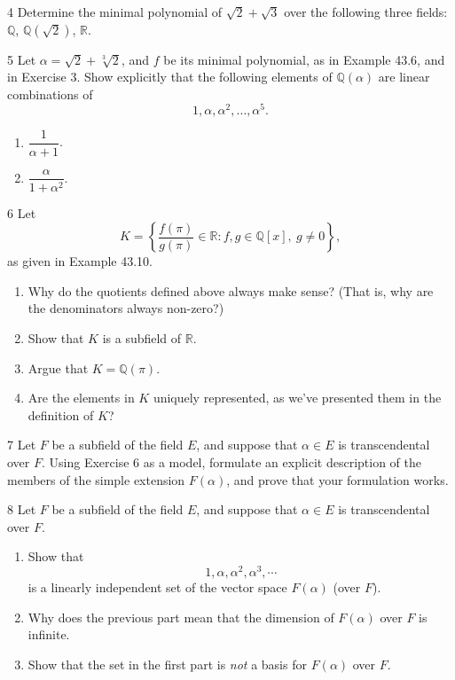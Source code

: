 \begin{problem}{4}
    Determine the minimal polynomial of $\sqrt{2} + \sqrt{3}$ over the following three
    fields: $\mathbb{Q}$, $\mathbb{Q}(\sqrt{2})$, $\mathbb{R}$.
\end{problem}
\unsolved

\begin{problem}{5}
    Let $\alpha = \sqrt{2} + \sqrt[3]{2}$, and $f$ be its minimal polynomial, as in
    Example 43.6, and in Exercise 3. Show explicitly that the following elements of
    $\mathbb{Q}(\alpha)$ are linear combinations of
    \[1, \alpha, \alpha^2, \ldots, \alpha^5.\]
    \begin{enumerate}
        \item[(a)] $\dfrac{1}{\alpha + 1}$.
        \item[(b)] $\dfrac{\alpha}{1 + \alpha^2}$.
    \end{enumerate}
\end{problem}
\unsolved

\begin{problem}{6}
    Let
    \[K = \left\{\frac{f(\pi)}{g(\pi)} \in \mathbb{R} : f, g \in \mathbb{Q}[x],\ g \neq 0\right\},\]
    as given in Example 43.10.
    \begin{enumerate}
        \item[(a)] Why do the quotients defined above always make sense? (That is, why are
        the denominators always non-zero?)
        \item[(b)] Show that $K$ is a subfield of $\mathbb{R}$.
        \item[(c)] Argue that $K = \mathbb{Q}(\pi)$.
        \item[(d)] Are the elements in $K$ uniquely represented, as we've presented them in
        the definition of $K$?
    \end{enumerate}
\end{problem}
\unsolved

\begin{problem}{7}
    Let $F$ be a subfield of the field $E$, and suppose that $\alpha \in E$ is
    transcendental over $F$. Using Exercise 6 as a model, formulate an explicit description
    of the members of the simple extension $F(\alpha)$, and prove that your formulation
    works.
\end{problem}
\unsolved

\begin{problem}{8}
    Let $F$ be a subfield of the field $E$, and suppose that $\alpha \in E$ is 
        transcendental over $F$.
    \begin{enumerate}
        \item Show that 
        \[1, \alpha, \alpha^2, \alpha^3, \cdots\]
        is a linearly independent set of the vector space $F(\alpha)$ (over $F$).
        \item Why does the previous part mean that the dimension of $F(\alpha)$ over $F$ is infinite.
        \item Show that the set in the first part is \emph{not} a basis for $F(\alpha)$ over $F$.
    \end{enumerate}
\end{problem}
\solved

